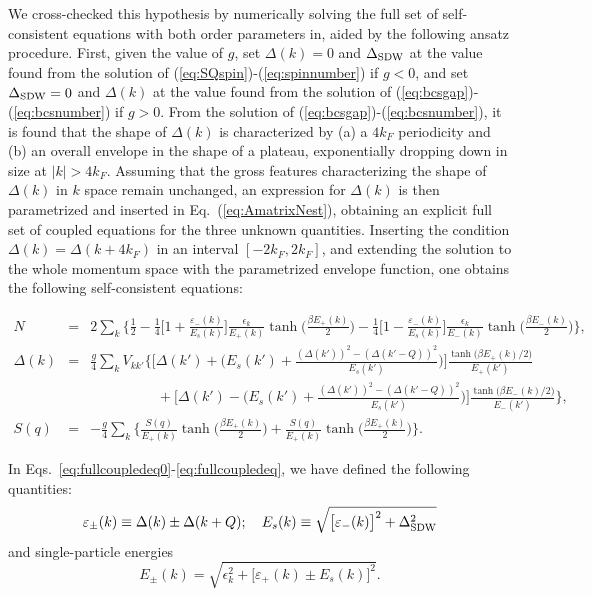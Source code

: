 \documentclass[pra,aps,superscriptaddress,twocolumn]{revtex4}
\begin{document}
We cross-checked this hypothesis by numerically solving the full set of self-consistent equations
with both order parameters in, aided by the following ansatz procedure.
First, given the value of $g$, set $\Delta(k)=0$ and $\Delta_{\rm SDW}$ at the value found from the solution of (\ref{eq:SQspin})-(\ref{eq:spinnumber}) if $g<0$, and set $\Delta_{\rm SDW}=0$ and $\Delta(k)$ at the value found from the solution of (\ref{eq:bcsgap})-(\ref{eq:bcsnumber}) if $g>0$. From the solution of (\ref{eq:bcsgap})-(\ref{eq:bcsnumber}), it is found that the shape of $\Delta(k)$ is characterized by (a) a $4k_F$ periodicity and (b) an overall envelope in the shape of a plateau, exponentially dropping down in size at $|k|> 4k_F$. Assuming that the gross features characterizing the shape of $\Delta(k)$ in $k$ space remain unchanged, an expression for $\Delta(k)$ is then parametrized and inserted in Eq.~(\ref{eq:AmatrixNest}), obtaining an explicit full set of coupled equations for the three unknown quantities.
Inserting the condition $\Delta(k)=\Delta(k+4k_F)$ in an interval $[-2k_F,2k_F]$, and extending the solution to the whole momentum space
with the parametrized envelope function, one obtains the following self-consistent equations:
\begin{widetext}
\begin{eqnarray}
N&=&2\sum_k\Bigg\{\frac{1}{2}-\frac{1}{4}\bigg[1+\frac{\varepsilon_-(k)}{E_s(k)}\bigg] \frac{\epsilon_k}{E_+(k)}\tanh\Big(\frac{\beta E_+(k)}{2}\Big)
-\frac{1}{4}\bigg[1-\frac{\varepsilon_-(k)}{E_s(k)}\bigg] \frac{\epsilon_k}{E_-(k)}\tanh\Big(\frac{\beta E_-(k)}{2}\Big) \Bigg\}, \label{eq:fullcoupledeq0}\\
\Delta(k)&=&\frac{g}{4}\sum_k V_{kk'}\Bigg\{\Bigg[\Delta(k')+\bigg(E_s(k')+\frac{(\Delta(k'))^2-(\Delta(k'-Q))^2}{E_s(k')}\bigg)\Bigg]\frac{\tanh\big({\beta E_+(k)}/{2}\big)}{E_+(k')}\nonumber\\
&&\hspace{2cm} +\Bigg[\Delta(k')-\bigg(E_s(k')+\frac{(\Delta(k'))^2-(\Delta(k'-Q))^2}{E_s(k')}\bigg)\Bigg]\frac{\tanh\big({\beta E_-(k)}/{2}\big)}{E_-(k')}\Bigg\}, \\
S(q)&=&-\frac{g}{4}\sum_k\Bigg\{\frac{S(q)}{E_+(k)}\tanh\Big(\frac{\beta E_+(k)}{2}\Big)+\frac{S(q)}{E_+(k)}\tanh\Big(\frac{\beta E_+(k)}{2}\Big)\Bigg\}.
\label{eq:fullcoupledeq}
\end{eqnarray}
\end{widetext}
In Eqs.~\eqref{eq:fullcoupledeq0}-\eqref{eq:fullcoupledeq}, we have defined the following quantities:
\begin{equation}
  \varepsilon_\pm(k) \equiv \Delta(k) \pm \Delta(k+Q); \quad
  E_s(k)\equiv \sqrt{ \big[ \varepsilon_-(k) \big]^2 + \Delta_{\rm SDW}^2}
\end{equation}
and single-particle energies
\begin{equation}
  E_\pm(k) = \sqrt{\epsilon_k^2+ \big[ \varepsilon_+(k)\pm E_s(k) \big]^2} .
\end{equation}
\end{document}
